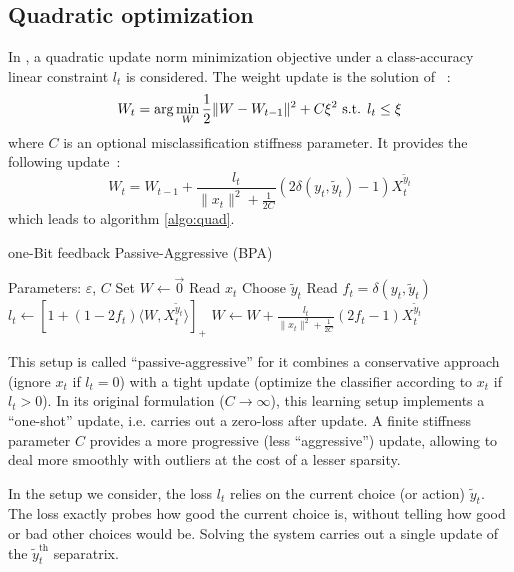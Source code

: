 \documentclass[preprint,12pt,authoryear]{elsarticle}
\begin{document}
\subsection{Quadratic optimization}
 
In \cite{crammer2006online}, a quadratic update norm minimization objective under a class-accuracy linear constraint $ l_t $ is considered.  
The weight update is the solution of ~:
$$W_{t} = \arg \min_W \frac{1}{2} \| W - W_{t-1}\|^2 + C \xi^2 \hbox{ s.t. } l_t \leq \xi$$
where $C$ is an optional misclassification stiffness parameter. It provides the following update~:
$$W_{t} =  W_{t-1} + \frac{l_t}{\|x_t\|^2 + \frac{1}{2C}} (2\delta(y_t,\tilde{y}_t) - 1) X_t^{\tilde{y}_t}$$
which leads to algorithm \ref{algo:quad}.

\begin{algorithm}[t!]
	\caption{one-Bit feedback Passive-Aggressive (BPA)}\label{algo:quad}
	\begin{algorithmic}
		\STATE Parameters:  $\varepsilon$, $C$
		\STATE Set $W \leftarrow \vec{0}$
		\STATE Read $x_t$
		\STATE Choose $\tilde{y}_t$
		\STATE Read $f_t = \delta(y_t,\tilde{y}_t)$
		\STATE $l_t \leftarrow \left[ 1+(1-2f_t)\langle W,X_t^{\tilde{y}_t}\rangle\right]_{+}$ 
		\STATE $W \leftarrow W + \frac{l_t}{\parallel x_t\parallel^2 + \frac{1}{2C}} (2f_t-1) X_t^{\tilde{y}_t}$
		\ENDFOR
	\end{algorithmic}
\end{algorithm}

This setup is called ``passive-aggressive'' for it combines a conservative approach (ignore $x_t$ if $l_t=0$) with a tight update (optimize the classifier according to $x_t$ if $l_t>0$).
In its original formulation ($C \rightarrow \infty$), this learning setup implements a ``one-shot'' update, i.e. carries out a zero-loss  after update. A finite stiffness parameter $C$ provides a more progressive (less ``aggressive'') update, allowing to deal more smoothly with outliers at the cost of a lesser sparsity.

In the setup we consider, the loss $l_t$ relies on the current choice (or action) $\tilde{y}_t$. The loss exactly probes how good the current choice is, without telling how good or bad other choices would be. Solving the system carries out a single update of the  $\tilde{y}_t^\text{th}$ separatrix. 
\end{document}
